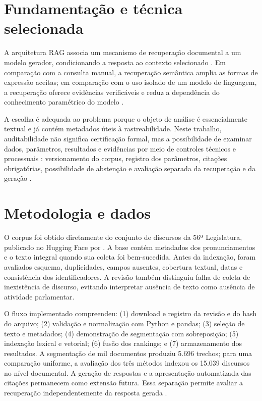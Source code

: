 \documentclass[12pt,a4paper]{article}
\begin{document}
\section{Fundamentação e técnica selecionada}

A arquitetura RAG associa um mecanismo de recuperação documental a um modelo
gerador, condicionando a resposta ao contexto selecionado
\cite{lewis2020rag}. Em comparação com a consulta manual, a recuperação
semântica amplia as formas de expressão aceitas; em comparação com o uso isolado
de um modelo de linguagem, a recuperação oferece evidências verificáveis e
reduz a dependência do conhecimento paramétrico do modelo
\cite{gao2023ragSurvey}.

A escolha é adequada ao problema porque o objeto de análise é essencialmente
textual e já contém metadados úteis à rastreabilidade. Neste trabalho,
auditabilidade não significa certificação formal, mas a possibilidade de
examinar dados, parâmetros, resultados e evidências por meio de controles
técnicos e processuais \cite{mokander2023auditing}: versionamento do corpus, registro dos parâmetros,
citações obrigatórias, possibilidade de abstenção e avaliação separada da
recuperação e da geração \cite{saadFalconEtAl2024ares}.

\section{Metodologia e dados}

O corpus foi obtido diretamente do conjunto de discursos da 56ª Legislatura,
publicado no Hugging Face por . A base contém metadados dos pronunciamentos e o
texto integral quando sua coleta foi bem-sucedida. Antes da indexação, foram
avaliados esquema, duplicidades, campos ausentes, cobertura textual, datas e
consistência dos identificadores. A revisão também distinguiu falha de coleta
de inexistência de discurso, evitando interpretar ausência de texto como
ausência de atividade parlamentar.

O fluxo implementado compreendeu: (1) download e registro da revisão e do hash
do arquivo; (2) validação e normalização com Python e pandas; (3) seleção de
texto e metadados; (4) demonstração de segmentação com sobreposição; (5)
indexação lexical e vetorial; (6) fusão dos rankings; e (7) armazenamento dos
resultados. A segmentação de mil documentos produziu 5.696 trechos; para uma
comparação uniforme, a avaliação dos três métodos indexou os 15.039 discursos
no nível documental. A geração de
respostas e a apresentação automatizada das citações permanecem como extensão
futura. Essa separação permite avaliar a recuperação independentemente da
resposta gerada \cite{gao2023ragSurvey,saadFalconEtAl2024ares}.
\end{document}
